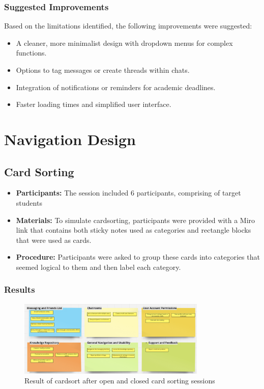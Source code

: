 \documentclass[12pt,a4paper]{article}
\begin{document}
\subsubsection{Suggested Improvements}
Based on the limitations identified, the following improvements were suggested:
\begin{itemize}
    \item A cleaner, more minimalist design with dropdown menus for complex functions.
    \item Options to tag messages or create threads within chats.
    \item Integration of notifications or reminders for academic deadlines.
    \item Faster loading times and simplified user interface.
\end{itemize}

\section{Navigation Design }
\subsection{Card Sorting}

\begin{itemize}
    \item \textbf{Participants:} The session included 6 participants, comprising of target students
    \item \textbf{Materials:} To simulate cardsorting, participants were provided with a Miro link that contains both sticky notes used as categories and rectangle blocks that were used as cards. 
    \item \textbf{Procedure:} Participants were asked to group these cards into categories that seemed logical to them and then label each category.
\end{itemize}

\subsubsection{Results}
\begin{figure}[h]
\centering
\includegraphics[width=0.8\textwidth]{cardsort.png} 
\caption{Result of cardsort after open and closed card sorting sessions}
\label{fig:sitemap}
\end{figure}
\end{document}
